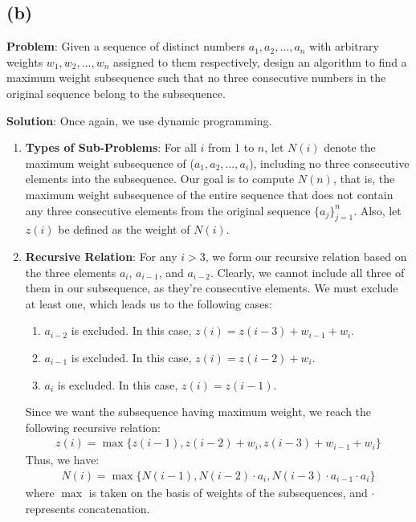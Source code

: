 \documentclass[11pt, fleqn]{article}
\begin{document}
\subsection*{(b)}

\textbf{Problem}: Given a sequence of distinct numbers $a_1, a_2, \dots, a_n$ with arbitrary weights $w_1, w_2, \dots, w_n$ assigned
to them respectively, design an algorithm to find a maximum weight subsequence such that no three consecutive numbers in the original
sequence belong to the subsequence.

\bigskip

\textbf{Solution}: Once again, we use dynamic programming.

\begin{enumerate}

\item \textbf{Types of Sub-Problems}: For all $i$ from 1 to $n$, let $N(i)$ denote the maximum weight subsequence of ($a_1, a_2, \dots, a_i$), including no three consecutive elements into the subsequence. Our goal is to compute $N(n)$, that is, the maximum weight subsequence of the entire sequence that does not contain any three consecutive elements from the original sequence $\{a_j\}_{j=1}^{n}$. Also, let $z(i)$ be defined as the weight of $N(i)$.

\item \textbf{Recursive Relation}: For any $i > 3$, we form our recursive relation based on the three elements $a_i$, $a_{i-1}$, and $a_{i-2}$. Clearly, we cannot include all three of them in our subsequence, as they're consecutive elements. We must exclude at least one, which leads us to the following cases:
\begin{enumerate}
    \item $a_{i-2}$ is excluded. In this case, $z(i) = z(i-3)+w_{i-1}+w_i$.
    \item $a_{i-1}$ is excluded. In this case, $z(i) = z(i-2)+w_i$.
    \item $a_{i}$ is excluded. In this case, $z(i) = z(i-1)$.
\end{enumerate}
Since we want the subsequence having maximum weight, we reach the following recursive relation:
\begin{align*}
    z(i) = \max\{z(i-1), z(i-2)+w_i, z(i-3)+w_{i-1}+w_i\}
\end{align*}
Thus, we have:
\begin{align*}
    N(i) = \max\{N(i-1), N(i-2)\cdot a_i, N(i-3)\cdot a_{i-1}\cdot a_i\}
\end{align*}
where $\max$ is taken on the basis of weights of the subsequences, and $\cdot$ represents concatenation.


\end{enumerate}
\end{document}
